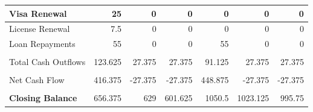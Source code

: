 \begin{table}[H]
\begin{tabular}{|l|r|r|r|r|r|r|}
    \midrule
    Visa Renewal & 25    & 0     & 0     & 0     & 0     & 0 \\
    \midrule
    License Renewal & 7.5   & 0     & 0     & 0     & 0     & 0 \\
    \midrule
    Loan Repayments & 55    & 0     & 0     & 55    & 0     & 0 \\
    \midrule
          &       &       &       &       &       &  \\
    \midrule
    Total Cash Outflows & 123.625 & 27.375 & 27.375 & 91.125 & 27.375 & 27.375 \\
    \midrule
          &       &       &       &       &       &  \\
    \midrule
    Net Cash Flow & 416.375 & -27.375 & -27.375 & 448.875 & -27.375 & -27.375 \\
    \midrule
          &       &       &       &       &       &  \\
    \midrule
    \textbf{Closing Balance} & 656.375 & 629   & 601.625 & 1050.5 & 1023.125 & 995.75 \\
    \bottomrule
    \hline
    \hline
    \end{tabular}%
  \label{tab:addlabel}%
\end{table}%

